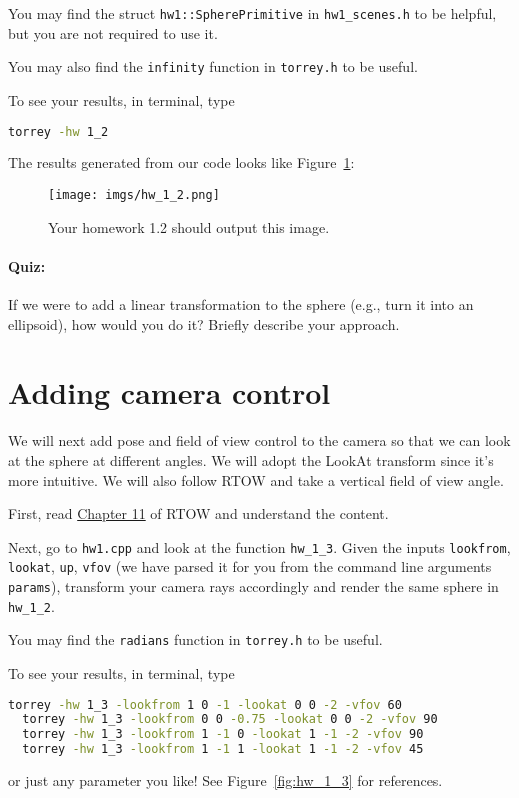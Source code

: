 You may find the struct \lstinline{hw1::SpherePrimitive} in \lstinline{hw1_scenes.h} to be helpful, but you are not required to use it.

You may also find the \lstinline{infinity} function in \lstinline{torrey.h} to be useful.

To see your results, in terminal, type
\begin{lstlisting}[language=bash]
  torrey -hw 1_2
\end{lstlisting}

The results generated from our code looks like Figure~\ref{fig:hw_1_2}:
\begin{figure}[ht]
    \centering
    \texttt{[image: imgs/hw\_1\_2.png]}
    \caption{Your homework 1.2 should output this image.}
    \label{fig:hw_1_2}
\end{figure}

\paragraph{Quiz:} If we were to add a linear transformation to the sphere (e.g., turn it into an ellipsoid), how would you do it? Briefly describe your approach.

\section{Adding camera control}
We will next add pose and field of view control to the camera so that we can look at the sphere at different angles. We will adopt the LookAt transform since it's more intuitive. We will also follow RTOW and take a vertical field of view angle.

First, read \href{https://raytracing.github.io/books/RayTracingInOneWeekend.html#positionablecamera}{Chapter 11} of RTOW and understand the content.

Next, go to \lstinline{hw1.cpp} and look at the function \lstinline{hw_1_3}. Given the inputs \lstinline{lookfrom}, \lstinline{lookat}, \lstinline{up}, \lstinline{vfov} (we have parsed it for you from the command line arguments \lstinline{params}), transform your camera rays accordingly and render the same sphere in \lstinline{hw_1_2}.

You may find the \lstinline{radians} function in \lstinline{torrey.h} to be useful.

To see your results, in terminal, type
\begin{lstlisting}[language=bash]
  torrey -hw 1_3 -lookfrom 1 0 -1 -lookat 0 0 -2 -vfov 60
  torrey -hw 1_3 -lookfrom 0 0 -0.75 -lookat 0 0 -2 -vfov 90
  torrey -hw 1_3 -lookfrom 1 -1 0 -lookat 1 -1 -2 -vfov 90
  torrey -hw 1_3 -lookfrom 1 -1 1 -lookat 1 -1 -2 -vfov 45
\end{lstlisting}
or just any parameter you like! See Figure~\ref{fig:hw_1_3} for references.

